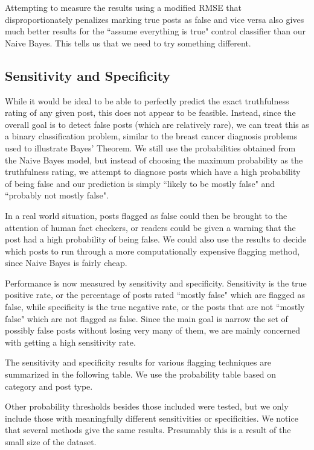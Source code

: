 \documentclass[12pt]{article}
\begin{document}
Attempting to measure the results using a modified RMSE that disproportionately penalizes marking true posts as false and vice versa also gives much better results for the ``assume everything is true" control classifier than our Naive Bayes. This tells us that we need to try something different.


\subsection*{Sensitivity and Specificity}

While it would be ideal to be able to perfectly predict the exact truthfulness rating of any given post, this does not appear to be feasible. Instead, since the overall goal is to detect false posts (which are relatively rare), we can treat this as a binary classification problem, similar to the breast cancer diagnosis problems used to illustrate Bayes' Theorem. We still use the probabilities obtained from the Naive Bayes model, but instead of choosing the maximum probability as the truthfulness rating, we attempt to diagnose posts which have a high probability of being false and our prediction is simply ``likely to be mostly false" and ``probably not mostly false".

In a real world situation, posts flagged as false could then be brought to the attention of human fact checkers, or readers could be given a warning that the post had a high probability of being false. We could also use the results to decide which posts to run through a more computationally expensive flagging method, since Naive Bayes is fairly cheap.

Performance is now measured by sensitivity and specificity. Sensitivity is the true positive rate, or the percentage of posts rated ``mostly false" which are flagged as false, while specificity is the true negative rate, or the posts that are not ``mostly false" which are not flagged as false. Since the main goal is narrow the set of possibly false posts without losing very many of them, we are mainly concerned with getting a high sensitivity rate.

The sensitivity and specificity results for various flagging techniques are summarized in the following table. We use the probability table based on category and post type.

Other probability thresholds besides those included were tested, but we only include those with meaningfully different sensitivities or specificities. We notice that several methods give the same results. Presumably this is a result of the small size of the dataset.
\end{document}
